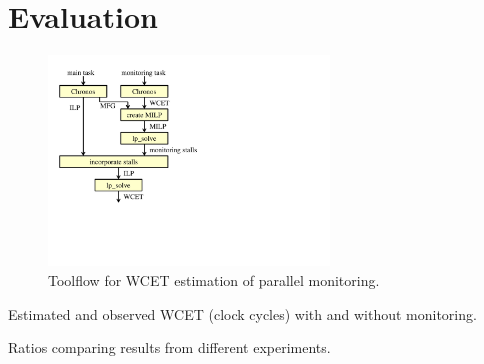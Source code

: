 \vspace{-0.1in}
\section{Evaluation}
\label{sec:evaluation}

\begin{figure}%
  \begin{center}
    \vspace{-0.1in}
    \includegraphics[height=2.2in]{figs/monitoring_wcet/toolflow.pdf}
    \vspace{-0.1in}
    \caption{Toolflow for WCET estimation of parallel monitoring.}
    \label{fig:evaluation.toolflow}
    \vspace{-0.3in}
  \end{center}
\end{figure}

\begin{table}[htb]
  \begin{center}
    \begin{small}
    
    \end{small}
    \vspace{-0.1in}
    \caption{Estimated and observed WCET (clock cycles) with and without monitoring.}
    \label{tab:evaluation.wcet}
    \vspace{-0.2in}
  \end{center}
\end{table}

\begin{table}[htb]
  \begin{center}
    \begin{small}
    
    \end{small}
    \vspace{-0.1in}
    \caption{Ratios comparing results from different experiments.} \label{tab:evaluation.ratios}
    \vspace{-0.3in}
  \end{center}
\end{table}

